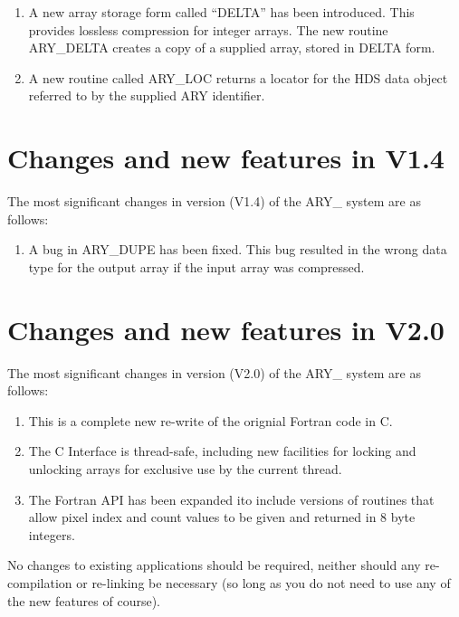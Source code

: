 \documentclass[twoside,11pt,nolof]{starlink}
\begin{document}
\begin{enumerate}

\item A new array storage form called ``DELTA'' has been introduced. This
provides lossless compression for integer arrays. The new routine
ARY\_DELTA creates a copy of a supplied array, stored in DELTA form.

\item A new routine called ARY\_LOC returns a locator for the
HDS data object referred to by the supplied ARY identifier.

\end{enumerate}

\section{%
Changes and new features in V1.4}
\label{changes_and_new_features_in_v14}
The most significant changes in version (V1.4) of the ARY\_ system are
as follows:

\begin{enumerate}

\item A bug in ARY\_DUPE has been fixed. This bug resulted in the wrong data
type for the output array if the input array was compressed.

\end{enumerate}

\section{%
Changes and new features in V2.0}
\label{changes_and_new_features_in_v20}
The most significant changes in version (V2.0) of the ARY\_ system are
as follows:

\begin{enumerate}

\item This is a complete new re-write of the orignial Fortran code in C.
\item The C Interface is thread-safe, including new facilities for locking
and unlocking arrays for exclusive use by the current thread.
\item The Fortran API has been expanded ito include versions of routines
that allow pixel index and count values to be given and returned in 8
byte integers.
\end{enumerate}

No changes to existing applications should be required, neither should any
re-compilation or re-linking be necessary (so long as you do not need to
use any of the new features of course).

\end{document}
